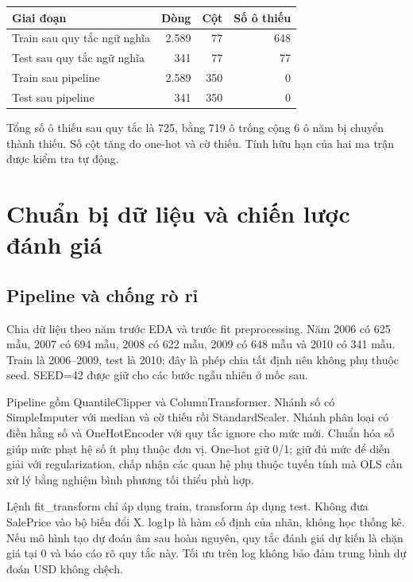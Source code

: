 \documentclass[12pt,a4paper]{article}
\begin{document}
\begingroup\small\setlength{\tabcolsep}{5pt}
\begin{tabularx}{\linewidth}{@{}Yrrr@{}}\toprule

\textbf{Giai đoạn} & \textbf{Dòng} & \textbf{Cột} & \textbf{Số ô thiếu}\\

\midrule

Train sau quy tắc ngữ nghĩa & 2.589 & 77 & 648\\

Test sau quy tắc ngữ nghĩa & 341 & 77 & 77\\

Train sau pipeline & 2.589 & 350 & 0\\

Test sau pipeline & 341 & 350 & 0\\

\bottomrule\end{tabularx}\endgroup\par

Tổng số ô thiếu sau quy tắc là 725, bằng 719 ô trống cộng 6 ô năm bị chuyển thành thiếu. Số cột tăng do one-hot và cờ thiếu. Tính hữu hạn của hai ma trận được kiểm tra tự động.


\clearpage

\section{Chuẩn bị dữ liệu và chiến lược đánh giá}

\subsection{Pipeline và chống rò rỉ}

Chia dữ liệu theo năm trước EDA và trước fit preprocessing. Năm 2006 có 625 mẫu, 2007 có 694 mẫu, 2008 có 622 mẫu, 2009 có 648 mẫu và 2010 có 341 mẫu. Train là 2006–2009, test là 2010; đây là phép chia tất định nên không phụ thuộc seed. SEED=42 được giữ cho các bước ngẫu nhiên ở mốc sau.


Pipeline gồm QuantileClipper và ColumnTransformer. Nhánh số có SimpleImputer với median và cờ thiếu rồi StandardScaler. Nhánh phân loại có điền hằng số và OneHotEncoder với quy tắc ignore cho mức mới. Chuẩn hóa số giúp mức phạt hệ số ít phụ thuộc đơn vị. One-hot giữ 0/1; giữ đủ mức để diễn giải với regularization, chấp nhận các quan hệ phụ thuộc tuyến tính mà OLS cần xử lý bằng nghiệm bình phương tối thiểu phù hợp.


Lệnh fit\_transform chỉ áp dụng train, transform áp dụng test. Không đưa SalePrice vào bộ biến đổi X. log1p là hàm cố định của nhãn, không học thống kê. Nếu mô hình tạo dự đoán âm sau hoàn nguyên, quy tắc đánh giá dự kiến là chặn giá tại 0 và báo cáo rõ quy tắc này. Tối ưu trên log không bảo đảm trung bình dự đoán USD không chệch.
\end{document}

